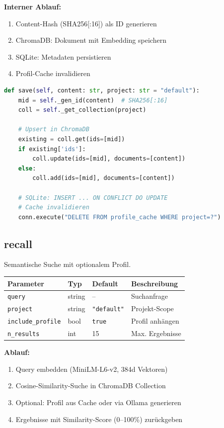 \documentclass[11pt,a4paper]{article}
\begin{document}
\vspace{1em}
\textbf{Interner Ablauf:}
\begin{enumerate}
    \item Content-Hash (SHA256[:16]) als ID generieren
    \item ChromaDB: Dokument mit Embedding speichern
    \item SQLite: Metadaten persistieren
    \item Profil-Cache invalidieren
\end{enumerate}

\begin{lstlisting}[style=code,language=Python,caption={store.py -- save()}]
def save(self, content: str, project: str = "default"):
    mid = self._gen_id(content)  # SHA256[:16]
    coll = self._get_collection(project)
    
    # Upsert in ChromaDB
    existing = coll.get(ids=[mid])
    if existing['ids']:
        coll.update(ids=[mid], documents=[content])
    else:
        coll.add(ids=[mid], documents=[content])
    
    # SQLite: INSERT ... ON CONFLICT DO UPDATE
    # Cache invalidieren
    conn.execute("DELETE FROM profile_cache WHERE project=?")
\end{lstlisting}


\subsection{recall}

Semantische Suche mit optionalem Profil.

\begin{tabular}{llll}
\toprule
\textbf{Parameter} & \textbf{Typ} & \textbf{Default} & \textbf{Beschreibung} \\
\midrule
\texttt{query} & string & -- & Suchanfrage \\
\texttt{project} & string & \texttt{"default"} & Projekt-Scope \\
\texttt{include\_profile} & bool & \texttt{true} & Profil anhängen \\
\texttt{n\_results} & int & 15 & Max. Ergebnisse \\
\bottomrule
\end{tabular}

\vspace{1em}
\textbf{Ablauf:}
\begin{enumerate}
    \item Query embedden (MiniLM-L6-v2, 384d Vektoren)
    \item Cosine-Similarity-Suche in ChromaDB Collection
    \item Optional: Profil aus Cache oder via Ollama generieren
    \item Ergebnisse mit Similarity-Score (0--100\%) zurückgeben
\end{enumerate}
\end{document}
